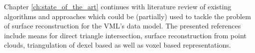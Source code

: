 Chapter \ref{ch:state_of_the_art} continues with literature review of existing algorithms and approaches which could be (partially) used to tackle the problem of surface reconstruction for the VML's data model.
The presented references include means for direct triangle intersection, surface reconstruction from point clouds, triangulation of dexel based as well as voxel based representations.

